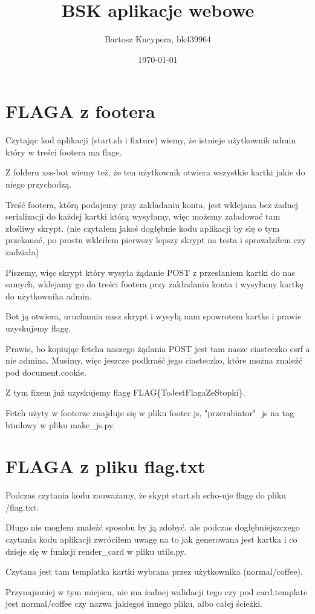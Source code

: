 \documentclass{article}
\title{BSK aplikacje webowe}
\author{Bartosz Kucypera, bk439964}
\date{\today}
\begin{document}
\maketitle

\section*{FLAGA z footera}
Czytając kod aplikacji (start.sh i fixture) wiemy, że istnieje użytkownik admin który w treści footera ma flage. 

Z folderu xss-bot wiemy też, że ten użytkownik otwiera wszystkie kartki jakie do niego przychodzą. 

Treść footera, którą podajemy przy zakładaniu konta, jest wklejana bez żadnej serializacji do każdej kartki którą wysyłamy, więc możemy załadować tam złośliwy skrypt. (nie czytałem jakoś dogłębnie kodu aplikacji by się o tym przekonać, po prostu wkleiłem pierwszy lepszy skrypt na testa i sprawdziłem czy zadziała)

Piszemy, więc skrypt który wysyła żądanie POST z przesłaniem kartki do nas samych, wklejamy go do treści footera przy zakładaniu konta i wysyłamy kartkę do użytkownika admin. 

Bot ją otwiera, uruchamia nasz skrypt i wysyłą nam spowrotem kartke i prawie uzyskujemy flagę. 

Prawie, bo kopiując fetcha naszego żądania POST jest tam nasze ciasteczko csrf a nie admina. Musimy, więc jeszcze podkraść jego ciasteczko, które można znaleźć pod document.cookie.

Z tym fixem już uzyskujemy flagę FLAG\{ToJestFlagaZeStopki\}.

Fetch użyty w footerze znajduje się w pliku footer.js, "przerabiator" $ $ js na tag htmlowy w pliku make\_js.py.

\section*{FLAGA z pliku flag.txt}
Podczas czytania kodu zauważamy, że skypt start.sh echo-uje flagę do pliku /flag.txt.

Długo nie mogłem znaleźć sposobu by ją zdobyć, ale podczas dogłębniejszczego czytania kodu aplikacji zwróciłem uwagę na to jak generowana jest kartka i co dzieje się w funkcji render\_card w pliku utils.py. 

Czytana jest tam templatka kartki wybrana przez użytkownika (normal/coffee).

Przynajmniej w tym miejscu, nie ma żadnej walidacji tego czy pod card.template jest normal/coffee czy nazwa jakiegoś innego pliku, albo całej ścieżki.
\end{document}
